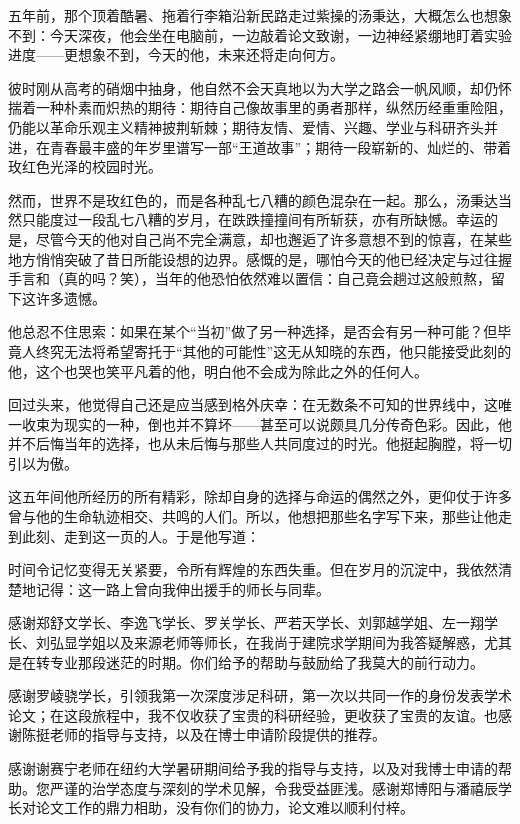 
\begin{acknowledgements}
五年前，那个顶着酷暑、拖着行李箱沿新民路走过紫操的汤秉达，大概怎么也想象不到：今天深夜，他会坐在电脑前，一边敲着论文致谢，一边神经紧绷地盯着实验进度——更想象不到，今天的他，未来还将走向何方。

彼时刚从高考的硝烟中抽身，他自然不会天真地以为大学之路会一帆风顺，却仍怀揣着一种朴素而炽热的期待：期待自己像故事里的勇者那样，纵然历经重重险阻，仍能以革命乐观主义精神披荆斩棘；期待友情、爱情、兴趣、学业与科研齐头并进，在青春最丰盛的年岁里谱写一部“王道故事”；期待一段崭新的、灿烂的、带着玫红色光泽的校园时光。

然而，世界不是玫红色的，而是各种乱七八糟的颜色混杂在一起。那么，汤秉达当然只能度过一段乱七八糟的岁月，在跌跌撞撞间有所斩获，亦有所缺憾。幸运的是，尽管今天的他对自己尚不完全满意，却也邂逅了许多意想不到的惊喜，在某些地方悄悄突破了昔日所能设想的边界。感慨的是，哪怕今天的他已经决定与过往握手言和（真的吗？笑），当年的他恐怕依然难以置信：自己竟会趟过这般煎熬，留下这许多遗憾。

他总忍不住思索：如果在某个“当初”做了另一种选择，是否会有另一种可能？但毕竟人终究无法将希望寄托于“其他的可能性”这无从知晓的东西，他只能接受此刻的他，这个也哭也笑平凡着的他，明白他不会成为除此之外的任何人。

回过头来，他觉得自己还是应当感到格外庆幸：在无数条不可知的世界线中，这唯一收束为现实的一种，倒也并不算坏——甚至可以说颇具几分传奇色彩。因此，他并不后悔当年的选择，也从未后悔与那些人共同度过的时光。他挺起胸膛，将一切引以为傲。

这五年间他所经历的所有精彩，除却自身的选择与命运的偶然之外，更仰仗于许多曾与他的生命轨迹相交、共鸣的人们。所以，他想把那些名字写下来，那些让他走到此刻、走到这一页的人。于是他写道：

时间令记忆变得无关紧要，令所有辉煌的东西失重。但在岁月的沉淀中，我依然清楚地记得：这一路上曾向我伸出援手的师长与同辈。

感谢郑舒文学长、李逸飞学长、罗关学长、严若天学长、刘郭越学姐、左一翔学长、刘弘显学姐以及来源老师等师长，在我尚于建院求学期间为我答疑解惑，尤其是在转专业那段迷茫的时期。你们给予的帮助与鼓励给了我莫大的前行动力。

感谢罗崚骁学长，引领我第一次深度涉足科研，第一次以共同一作的身份发表学术论文；在这段旅程中，我不仅收获了宝贵的科研经验，更收获了宝贵的友谊。也感谢陈挺老师的指导与支持，以及在博士申请阶段提供的推荐。

感谢谢赛宁老师在纽约大学暑研期间给予我的指导与支持，以及对我博士申请的帮助。您严谨的治学态度与深刻的学术见解，令我受益匪浅。感谢郑博阳与潘禧辰学长对论文工作的鼎力相助，没有你们的协力，论文难以顺利付梓。


\end{acknowledgements}
